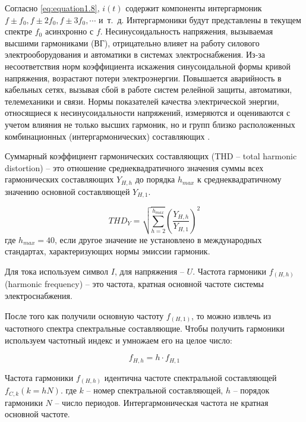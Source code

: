 Согласно \ref{eq:equation1.8}, $i(t)$  содержит компоненты интергармоник $f\pm f_{0},f\pm 2f_{0}, f\pm 3f_{0}, \cdots $ и~т.~д. Интергармоники будут представлены в текущем спектре $f_0$ асинхронно с $f$. 
Несинусоидальность напряжения, вызываемая высшими гармониками (ВГ), отрицательно влияет на работу силового электрооборудования и автоматики в системах электроснабжения. Из-за несоответствия норм коэффициента искажения синусоидальной формы кривой напряжения, возрастают потери электроэнергии. Повышается аварийность в кабельных сетях, вызывая сбой в работе систем релейной защиты, автоматики, телемеханики и связи.
Нормы показателей качества электрической энергии, относящиеся к несинусоидальности напряжений, измеряются и оцениваются с учетом влияния не только высших гармоник, но и групп близко расположенных комбинационных (интергармонических) составляющих \cite{532851}.


Суммарный коэффициент гармонических составляющих (THD – total harmonic distortion) – это отношение среднеквадратичного значения суммы всех гармонических составляющих $Y_{H,h}$ до порядка $h_{max}$ к среднеквадратичному значению основной составляющей $Y_{H,1}$. 

\begin{equation}
	\label{eq:equation1.9}
THD_{Y} = \sqrt{\displaystyle\sum_{h=2}^{h_{max}}} (\frac{Y_{H,h}}{Y_{H,1}})^2
\end{equation} 
где $h_{max}=40$, если другое значение не установлено в международных стандартах, характеризующих нормы эмиссии гармоник.

Для тока используем символ $I$, для напряжения – $U$.
Частота гармоники $f_{(H,h)}$ (harmonic frequency) – это частота, кратная основной частоте системы электроснабжения.

После того как получили основную частоту $f_{(H,1)}$, то можно извлечь из частотного спектра спектральные составляющие. Чтобы получить гармоники используем частотный индекс и умножаем его на целое число:

\begin{equation}
	\label{eq:equation1.10}
	f_{H,h} = h \cdot f_{H,1}
\end{equation} 

Частота гармоники $f_{(H,h)}$ идентична частоте спектральной составляющей $f_{C,k}(k=hN)$.
где $k$ – номер спектральной составляющей, $h$  – порядок гармоники $N$ – число периодов.
Интергармоническая частота не кратная основной частоте.

